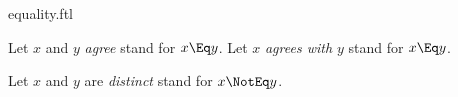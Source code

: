 \documentclass{stex}
\begin{document}
\begin{smodule}{equality.ftl}


\begin{convention*}
  Let $x$ and $y$ \emph{agree} stand for $x \Eq y$.
  Let $x$ \emph{agrees with $y$} stand for $x \Eq y$.
\end{convention*}

\begin{convention*}
  Let $x$ and $y$ are \emph{distinct} stand for $x \NotEq y$.
\end{convention*}

\end{smodule}
\end{document}
